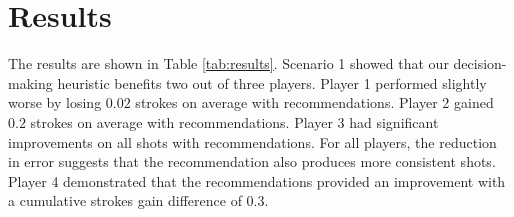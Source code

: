 \documentclass[11pt,a4paper]{article}
\begin{document}
\section{Results}
The results are shown in Table \ref{tab:results}. Scenario 1 showed that our decision-making heuristic benefits two out of three players. Player 1 performed slightly worse by losing $0.02$ strokes on average with recommendations. Player 2 gained $0.2$ strokes on average with recommendations. Player 3 had significant improvements on all shots with recommendations. For all players, the reduction in error suggests that the recommendation also produces more consistent shots. Player 4 demonstrated that the recommendations provided an improvement with a cumulative strokes gain difference of $0.3$.



\end{document}
